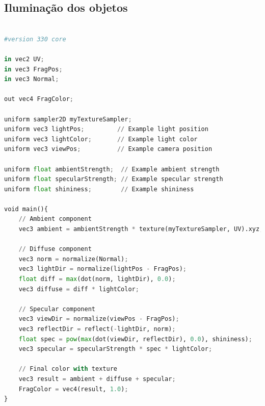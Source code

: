 \documentclass[12pt,a4paper]{memoir}
\begin{document}
\newpage

\subsection{Iluminação dos objetos}

\begin{lstlisting}[language=Python, caption=Codigo que junta varios fatores para criar a iluminçao de cada fragmento da superficie dos objetos]

#version 330 core

in vec2 UV;
in vec3 FragPos;
in vec3 Normal;

out vec4 FragColor;

uniform sampler2D myTextureSampler;
uniform vec3 lightPos;         // Example light position
uniform vec3 lightColor;       // Example light color
uniform vec3 viewPos;          // Example camera position

uniform float ambientStrength;  // Example ambient strength
uniform float specularStrength; // Example specular strength
uniform float shininess;        // Example shininess

void main(){
    // Ambient component
    vec3 ambient = ambientStrength * texture(myTextureSampler, UV).xyz;

    // Diffuse component
    vec3 norm = normalize(Normal);
    vec3 lightDir = normalize(lightPos - FragPos);
    float diff = max(dot(norm, lightDir), 0.0);
    vec3 diffuse = diff * lightColor;

    // Specular component
    vec3 viewDir = normalize(viewPos - FragPos);
    vec3 reflectDir = reflect(-lightDir, norm);
    float spec = pow(max(dot(viewDir, reflectDir), 0.0), shininess);
    vec3 specular = specularStrength * spec * lightColor;

    // Final color with texture
    vec3 result = ambient + diffuse + specular;
    FragColor = vec4(result, 1.0);
}

\end{lstlisting}

\newpage
\end{document}
